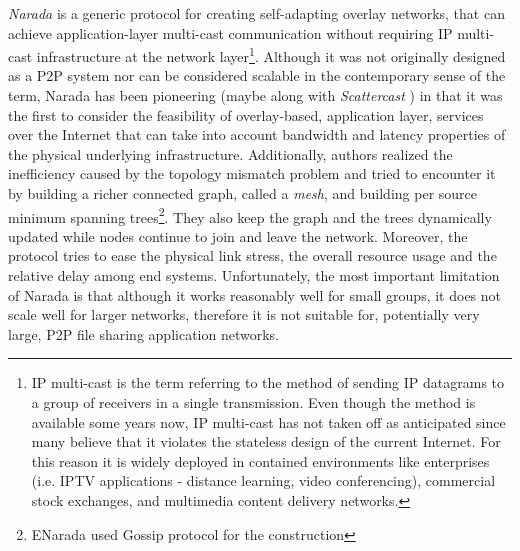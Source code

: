 
\emph{Narada} \cite{CRZ2000,CRSZ2001,CRSZ2002} is a generic
protocol for creating self-adapting overlay networks, that can achieve
application-layer multi-cast communication without requiring IP multi-cast
infrastructure at the network layer\footnote{
  IP multi-cast is the term referring to the method of sending IP datagrams to a
  group of receivers in a single transmission. Even though the method is
  available some years now, IP multi-cast has not taken off as anticipated since
  many believe that it violates the stateless design of the current Internet.
  For this reason it is widely deployed in contained environments like
  enterprises (i.e. IPTV applications - distance learning, video conferencing),
  commercial stock exchanges, and multimedia content delivery networks.
}. Although it was not originally designed as a P2P system nor can be considered
scalable in the contemporary sense of the term, Narada has been pioneering
(maybe along with \emph{Scattercast} \cite{C2000}) in that
it was the first to consider the feasibility of overlay-based, application
layer, services over the Internet that can take into account bandwidth and
latency properties of the physical underlying infrastructure. Additionally,
authors realized the inefficiency caused by the topology mismatch problem and
tried to encounter it by building a richer connected graph, called a
\emph{mesh}, and building per source minimum spanning trees\footnote{
  ENarada \cite{LYL2008} used Gossip protocol for the
construction
}.
They also keep the graph and the trees
dynamically updated while nodes continue to join and leave the network.
Moreover, the protocol tries to ease the physical link stress, the overall
resource usage and the relative delay among end systems. Unfortunately, the most
important limitation of Narada is that although it works reasonably well for
small groups, it does not scale well for larger networks, therefore it is not
suitable for, potentially very large, P2P file sharing application networks.

